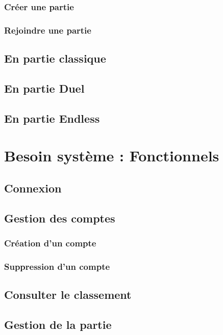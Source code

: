 \documentclass{article}
\begin{document}
\subsubsection{Créer une partie}

\subsubsection{Rejoindre une partie}

\subsection{En partie classique}

\subsection{En partie Duel}

\subsection{En partie Endless}

\section{Besoin système : Fonctionnels}

\subsection{Connexion}

\subsection{Gestion des comptes}

\subsubsection{Création d'un compte}

\subsubsection{Suppression d'un compte}

\subsection{Consulter le classement}

\subsection{Gestion de la partie}
\end{document}

